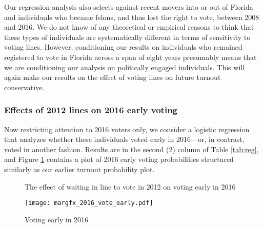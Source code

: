 \documentclass[12pt,titlepage]{article}
\begin{document}
Our regression analysis also selects against recent movers into or out
of Florida and individuals who became felons, and thus lost the right
to vote, between 2008 and 2016.  We do not know of any theoretical or
empirical reasons to think that these types of individuals are
systematically different in terms of sensitivity to voting lines.
However, conditioning our results on individuals who remained
registered to vote in Florida across a span of eight years presumably
means that we are conditioning our analysis on politically engaged
individuals.  This will again make our results on the effect of voting
lines on future turnout conservative.




\subsubsection*{Effects of 2012 lines on 2016 early voting}

Now restricting attention to 2016 voters only, we consider a logistic
regression that analyzes whether these individuals voted early in
2016---or, in contrast, voted in another fashion.  \mbox{Results} are
in the second (2) column of Table \ref{tab:reg}, and Figure
\ref{fig:atevotingearly2016} contains a plot of 2016 early voting
probabilities structured similarly as our earlier turnout probability
plot.

\begin{figure}[!ht]
  \caption{The effect of waiting in line to vote in 2012 on voting early in 2016}
  \centering\texttt{[image: margfx\_2016\_vote\_early.pdf]}
  \caption{Voting early in 2016}
  \label{fig:atevotingearly2016}
\end{figure}
\end{document}
